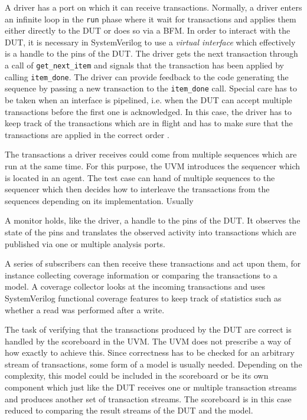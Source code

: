 \documentclass[12pt]{report}
\newcommand{\ttt}{\texttt}
\begin{document}
A driver has a port on which it can receive transactions. Normally, a driver enters an infinite loop in the \ttt{run}
phase where it wait for transactions and applies them either directly to the DUT or does so via a BFM. In order to
interact with the DUT, it is necessary in SystemVerilog to use a \textit{virtual interface} which effectively is a
handle to the pins of the DUT. The driver gets the next transaction through a call of \ttt{get\_next\_item} and
signals that the transaction has been applied by calling \ttt{item\_done}. The driver can provide feedback to the
code generating the sequence by passing a new transaction to the \ttt{item\_done} call. Special care has to be taken
when an interface is pipelined, i.e. when the DUT can accept multiple transactions before the first one is
acknowledged. In this case, the driver has to keep track of the transactions which are in flight and has to make sure
that the transactions are applied in the correct order \cite[ch. 4.7]{mehta2018asic}.

The transactions a driver receives could come from multiple sequences which are run at the same time. For this
purpose, the UVM introduces the sequencer which is located in an agent. The test case can hand of multiple sequences
to the sequencer which then decides how to interleave the transactions from the sequences depending on its
implementation. Usually

A monitor holds, like the driver, a handle to the pins of the DUT. It observes the state of the pins and translates
the observed activity into transactions which are published via one or multiple analysis ports.

A series of subscribers can then receive these transactions and act upon them, for instance collecting coverage
information or comparing the transactions to a model. A coverage collector looks at the incoming transactions and
uses SystemVerilog functional coverage features to keep track of statistics such as whether a read was performed after a write.

The task of verifying that the transactions produced by the DUT are correct is handled by the scoreboard in the UVM.
The UVM does not prescribe a way of how exactly to achieve this. Since correctness has to be checked for an arbitrary
stream of transactions, some form of a model is usually needed. Depending on the complexity, this model could be
included in the scoreboard or be its own component which just like the DUT receives one or multiple transaction
streams and produces another set of transaction streams. The scoreboard is in this case reduced to comparing the
result streams of the DUT and the model.
\end{document}
